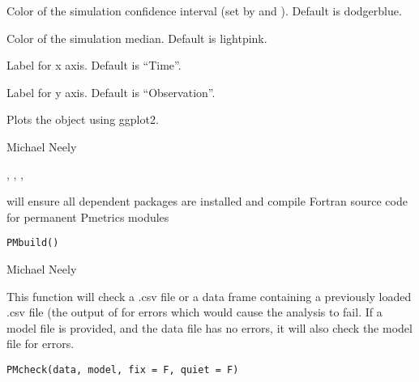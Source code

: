 \documentclass[a4paper]{book}
\begin{document}
\begin{Arguments}
\begin{ldescription}
\item[\code{col.sim.ci}] Color of the simulation confidence interval (set by  and ).
Default is dodgerblue.

\item[\code{col.sim.med}] Color of the simulation median.
Default is lightpink.

\item[\code{xlab}] Label for x axis.  Default is ``Time''.

\item[\code{ylab}] Label for y axis.  Default is ``Observation''.
\end{ldescription}
\end{Arguments}
%
\begin{Value}
Plots the object using ggplot2.
\end{Value}
%
\begin{Author}\relax
Michael Neely
\end{Author}
%
\begin{SeeAlso}\relax
{}, , , 
\end{SeeAlso}
%
\begin{Description}\relax
{} will ensure all dependent packages are installed and compile
Fortran source code for permanent Pmetrics modules
\end{Description}
%
\begin{Usage}
\begin{verbatim}
PMbuild()
\end{verbatim}
\end{Usage}
%
\begin{Author}\relax
Michael Neely
\end{Author}
%
\begin{Description}\relax
This function will check a .csv file or a data frame containing a
previously loaded .csv file (the output of  for errors
which would cause the analysis to fail.  If a model file is provided, and the data
file has no errors, it will also check the model file for errors.
\end{Description}
%
\begin{Usage}
\begin{verbatim}
PMcheck(data, model, fix = F, quiet = F)
\end{verbatim}
\end{Usage}
\end{document}
